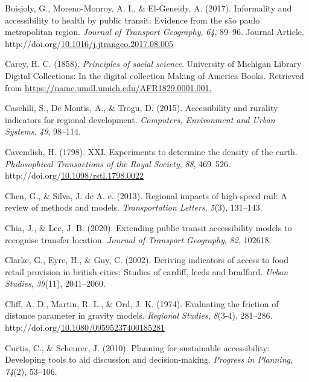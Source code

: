 \documentclass[
11pt, %
oneside, %
english, %
singlespacing, %
]{macthesis} %
\newlength{\cslhangindent}
\newenvironment{CSLReferences}[2] %
{\begin{list}{}{%
	\setlength{\itemindent}{0pt}
	\setlength{\leftmargin}{0pt}
	\setlength{\parsep}{0pt}
	\ifodd #1
	\setlength{\leftmargin}{\cslhangindent}
	\setlength{\itemindent}{-1\cslhangindent}
	\fi
	\setlength{\itemsep}{#2\baselineskip}}}
{\end{list}}
\begin{document}
\begin{CSLReferences}{1}{0}
Boisjoly, G., Moreno-Monroy, A. I., \& El-Geneidy, A. (2017). Informality and accessibility to health by public transit: Evidence from the são paulo metropolitan region. \emph{Journal of Transport Geography}, \emph{64}, 89--96. Journal Article. http://doi.org/\href{https://doi.org/10.1016/j.jtrangeo.2017.08.005}{10.1016/j.jtrangeo.2017.08.005}

Carey, H. C. (1858). \emph{Principles of social science}. University of Michigan Library Digital Collections: In the digital collection Making of America Books. Retrieved from \url{https://name.umdl.umich.edu/AFR1829.0001.001.}

Caschili, S., De Montis, A., \& Trogu, D. (2015). Accessibility and rurality indicators for regional development. \emph{Computers, Environment and Urban Systems}, \emph{49}, 98--114.

Cavendish, H. (1798). {XXI}. {Experiments} to determine the density of the earth. \emph{Philosophical Transactions of the Royal Society}, \emph{88}, 469--526. http://doi.org/\href{https://doi.org/10.1098/rstl.1798.0022}{10.1098/rstl.1798.0022}

Chen, G., \& Silva, J. de A. e. (2013). Regional impacts of high-speed rail: A review of methods and models. \emph{Transportation Letters}, \emph{5}(3), 131--143.

Chia, J., \& Lee, J. B. (2020). Extending public transit accessibility models to recognise transfer location. \emph{Journal of Transport Geography}, \emph{82}, 102618.

Clarke, G., Eyre, H., \& Guy, C. (2002). Deriving indicators of access to food retail provision in british cities: Studies of cardiff, leeds and bradford. \emph{Urban Studies}, \emph{39}(11), 2041--2060.

Cliff, A. D., Martin, R. L., \& Ord, J. K. (1974). Evaluating the friction of distance parameter in gravity models. \emph{Regional Studies}, \emph{8}(3-4), 281--286. http://doi.org/\href{https://doi.org/10.1080/09595237400185281}{10.1080/09595237400185281}

Curtis, C., \& Scheurer, J. (2010). Planning for sustainable accessibility: Developing tools to aid discussion and decision-making. \emph{Progress in Planning}, \emph{74}(2), 53--106.


\end{CSLReferences}
\end{document}
